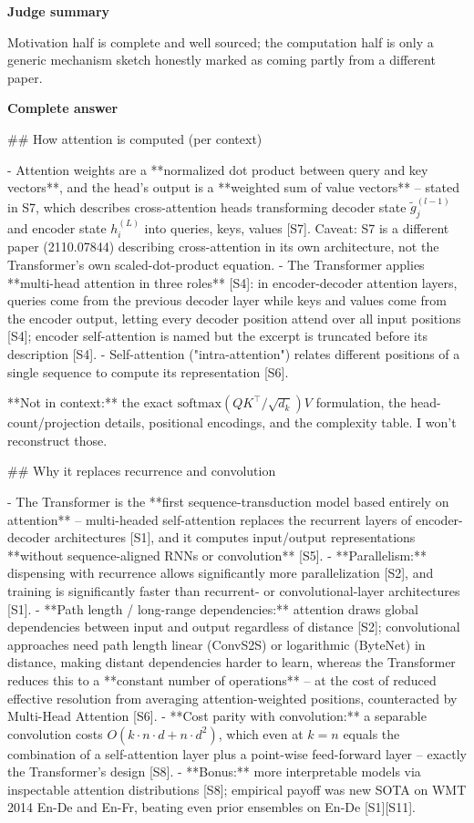 \documentclass[10pt]{article}
\begin{document}
\textbf{Judge summary}
\begin{EvidenceText}
Motivation half is complete and well sourced; the computation half is only a generic mechanism sketch honestly marked as coming partly from a different paper.
\end{EvidenceText}

\textbf{Complete answer}
\begin{AnswerText}
## How attention is computed (per context)

- Attention weights are a **normalized dot product between query and key vectors**, and the head's output is a **weighted sum of value vectors** -- stated in S7, which describes cross-attention heads transforming decoder state $\tilde{g}_j^{(l-1)}$ and encoder state $h_i^{(L)}$ into queries, keys, values [S7]. Caveat: S7 is a different paper (2110.07844) describing cross-attention in its own architecture, not the Transformer's own scaled-dot-product equation.
- The Transformer applies **multi-head attention in three roles** [S4]: in encoder-decoder attention layers, queries come from the previous decoder layer while keys and values come from the encoder output, letting every decoder position attend over all input positions [S4]; encoder self-attention is named but the excerpt is truncated before its description [S4].
- Self-attention ("intra-attention") relates different positions of a single sequence to compute its representation [S6].

**Not in context:** the exact $\mathrm{softmax}(QK^\top/\sqrt{d_k})V$ formulation, the head-count/projection details, positional encodings, and the complexity table. I won't reconstruct those.

## Why it replaces recurrence and convolution

- The Transformer is the **first sequence-transduction model based entirely on attention** -- multi-headed self-attention replaces the recurrent layers of encoder-decoder architectures [S1], and it computes input/output representations **without sequence-aligned RNNs or convolution** [S5].
- **Parallelism:** dispensing with recurrence allows significantly more parallelization [S2], and training is significantly faster than recurrent- or convolutional-layer architectures [S1].
- **Path length / long-range dependencies:** attention draws global dependencies between input and output regardless of distance [S2]; convolutional approaches need path length linear (ConvS2S) or logarithmic (ByteNet) in distance, making distant dependencies harder to learn, whereas the Transformer reduces this to a **constant number of operations** -- at the cost of reduced effective resolution from averaging attention-weighted positions, counteracted by Multi-Head Attention [S6].
- **Cost parity with convolution:** a separable convolution costs $O(k\cdot n\cdot d + n\cdot d^2)$, which even at $k=n$ equals the combination of a self-attention layer plus a point-wise feed-forward layer -- exactly the Transformer's design [S8].
- **Bonus:** more interpretable models via inspectable attention distributions [S8]; empirical payoff was new SOTA on WMT 2014 En-De and En-Fr, beating even prior ensembles on En-De [S1][S11].


\end{AnswerText}
\end{document}
